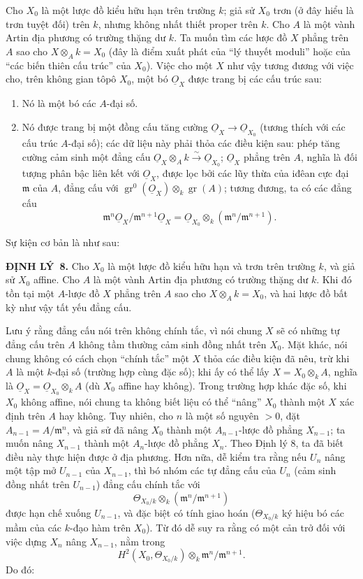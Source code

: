 \documentclass[11pt,twoside,openany]{book}
\numberwithin{equation}{section}
\newcommand{\src}[1]{%
  \phantomsection\hypertarget{src:\fgasourceid:#1}{}%
  \marginpar{\raggedleft\footnotesize\sffamily #1}%
}
\newcommand{\fgasourceid}{unset}
\newcommand{\Osh}{\underline{O}}
\newcommand{\result}[2]{\par\medskip\noindent\textbf{#1\if\relax\detokenize{#2}\relax\else\ #2\fi.}\quad}
\begin{document}
Cho $X_0$ là một lược đồ kiểu hữu hạn trên trường $k$; giả sử $X_0$ trơn (ở
đây hiểu là trơn tuyệt đối) trên $k$, nhưng không nhất thiết proper trên $k$.
Cho $A$ là một vành Artin địa phương có trường thặng dư $k$. Ta muốn tìm các
lược đồ $X$ phẳng trên $A$ sao cho $X\otimes_A k=X_0$ (đây là điểm xuất phát
của “lý thuyết moduli” hoặc của “các biến thiên cấu trúc” của $X_0$). Việc cho
một $X$ như vậy tương đương với việc cho, trên không gian tôpô $X_0$, một bó
$\Osh_X$ được trang bị các cấu trúc sau:
\begin{enumerate}
  \item[\textit{i.}] Nó là một bó các $A$-đại số.
  \item[\textit{ii.}] Nó được trang bị một đồng cấu tăng cường
    $\Osh_X\longrightarrow\Osh_{X_0}$ (tương thích với các cấu trúc
    $A$-đại số); các dữ liệu này phải thỏa các điều kiện sau: phép tăng cường
    cảm sinh một đẳng cấu
    $\Osh_X\otimes_A k\xrightarrow{\sim}\Osh_{X_0}$; $\Osh_X$ phẳng trên
    $A$, nghĩa là đối tượng phân bậc liên kết với $\Osh_X$, được lọc bởi các
    lũy thừa của iđêan cực đại $\mathfrak m$ của $A$, đẳng cấu với
    $\operatorname{gr}^0(\Osh_X)\otimes_k\operatorname{gr}(A)$; tương đương,
    ta có các đẳng cấu
    \[
      \mathfrak m^n\Osh_X/\mathfrak m^{n+1}\Osh_X
      =\Osh_{X_0}\otimes_k(\mathfrak m^n/\mathfrak m^{n+1}).
    \]
\end{enumerate}
Sự kiện cơ bản là như sau:

\src{204}
\result{ĐỊNH LÝ}{8} Cho $X_0$ là một lược đồ kiểu hữu hạn và trơn trên trường
$k$, và giả sử $X_0$ affine. Cho $A$ là một vành Artin địa phương có trường
thặng dư $k$. Khi đó tồn tại một $A$-lược đồ $X$ phẳng trên $A$ sao cho
$X\otimes_A k=X_0$, và hai lược đồ bất kỳ như vậy tất yếu đẳng cấu.

Lưu ý rằng đẳng cấu nói trên không chính tắc, vì nói chung $X$ sẽ có những tự
đẳng cấu trên $A$ không tầm thường cảm sinh đồng nhất trên $X_0$. Mặt khác,
nói chung không có cách chọn “chính tắc” một $X$ thỏa các điều kiện đã nêu,
trừ khi $A$ là một $k$-đại số (trường hợp cùng đặc số); khi ấy có thể lấy
$X=X_0\otimes_k A$, nghĩa là $\Osh_X=\Osh_{X_0}\otimes_k A$ (dù $X_0$ affine
hay không). Trong trường hợp khác đặc số, khi $X_0$ không affine, nói chung ta
không biết liệu có thể “nâng” $X_0$ thành một $X$ xác định trên $A$ hay không.
Tuy nhiên, cho $n$ là một số nguyên $>0$, đặt
$A_{n-1}=A/\mathfrak m^n$, và giả sử đã nâng $X_0$ thành một
$A_{n-1}$-lược đồ phẳng $X_{n-1}$; ta muốn nâng $X_{n-1}$ thành một
$A_n$-lược đồ phẳng $X_n$. Theo Định lý 8, ta đã biết điều này thực hiện được
ở địa phương. Hơn nữa, dễ kiểm tra rằng nếu $U_n$ nâng một tập mở $U_{n-1}$
của $X_{n-1}$, thì bó nhóm các tự đẳng cấu của $U_n$ (cảm sinh đồng nhất trên
$U_{n-1}$) đẳng cấu chính tắc với
\[
  \Theta_{X_0/k}\otimes_k(\mathfrak m^n/\mathfrak m^{n+1})
\]
được hạn chế xuống $U_{n-1}$, và đặc biệt có tính giao hoán
($\Theta_{X_0/k}$ ký hiệu bó các mầm của các $k$-đạo hàm trên $X_0$). Từ đó
dễ suy ra rằng có một cản trở đối với việc dựng $X_n$ nâng $X_{n-1}$, nằm
trong
\[
  H^2(X_0,\Theta_{X_0/k})\otimes_k
  \mathfrak m^n/\mathfrak m^{n+1}.
\]
Do đó:
\end{document}
